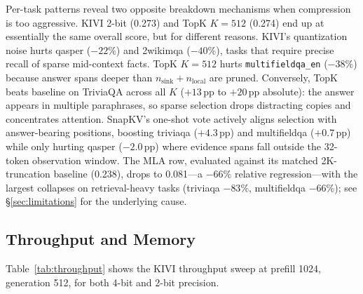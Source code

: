 \documentclass[conference]{IEEEtran}
\begin{document}
Per-task patterns reveal two opposite breakdown mechanisms when
compression is too aggressive.  KIVI 2-bit (0.273) and TopK
$K\!=\!512$ (0.274) end up at essentially the same overall score, but
for different reasons.  KIVI's quantization noise hurts qasper
($-22\%$) and 2wikimqa ($-40\%$), tasks that require precise recall of
sparse mid-context facts.  TopK $K\!=\!512$ hurts
\texttt{multifieldqa\_en} ($-38\%$) because answer spans deeper than
$n_\text{sink} + n_\text{local}$ are pruned.  Conversely, TopK beats
baseline on TriviaQA across all $K$ ($+13$\,pp to $+20$\,pp absolute):
the answer appears in multiple paraphrases, so sparse selection drops
distracting copies and concentrates attention.  SnapKV's one-shot vote
actively aligns selection with answer-bearing positions, boosting
triviaqa ($+4.3$\,pp) and multifieldqa ($+0.7$\,pp) while only hurting
qasper ($-2.0$\,pp) where evidence spans fall outside the 32-token
observation window.  The MLA row, evaluated against its matched
2K-truncation baseline (0.238), drops to 0.081---a $-66\%$ relative
regression---with the largest collapses on retrieval-heavy tasks
(triviaqa $-83\%$, multifieldqa $-66\%$); see \S\ref{sec:limitations}
for the underlying cause.

\subsection{Throughput and Memory}

Table~\ref{tab:throughput} shows the KIVI throughput sweep at prefill
1024, generation 512, for both 4-bit and 2-bit precision.
\end{document}
